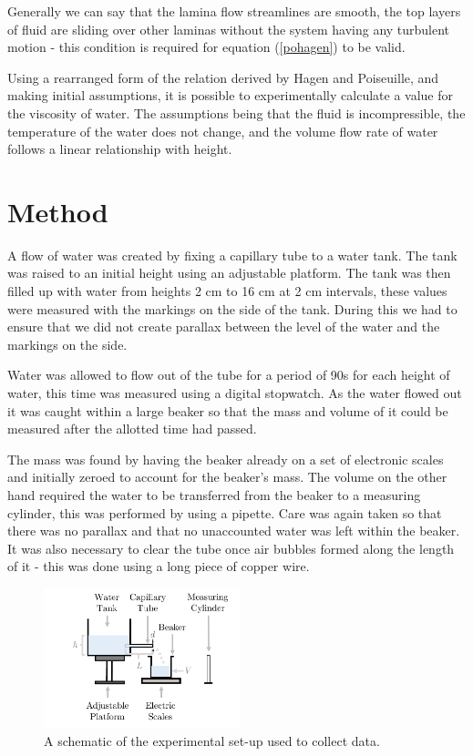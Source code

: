 \documentclass[twocolumn]{revtex4}
\begin{document}
Generally we can say that the lamina flow streamlines are smooth, the top layers of fluid are sliding over other laminas without the system having any turbulent motion - this condition is required for equation (\ref{pohagen}) to be valid. 

Using a rearranged form of the relation derived by Hagen and Poiseuille, and making initial assumptions, it is possible to experimentally calculate a value for the viscosity of water. The assumptions being that the fluid is incompressible, the temperature of the water does not change, and the volume flow rate of water follows a linear relationship with height.

\vspace{-3ex}
\section{Method} 
\vspace{-2ex}
A flow of water was created by fixing a capillary tube to a water tank. The tank was raised to an initial height using an adjustable platform. The tank was then filled up with water from heights 2 cm to 16 cm at 2 cm intervals, these values were measured with the markings on the side of the tank. During this we had to ensure that we did not create parallax between the level of the water and the markings on the side. 

Water was allowed to flow out of the tube for a period of 90s for each height of water, this time was measured using a digital stopwatch. As the water flowed out it was caught within a large beaker so that the mass and volume of it could be measured after the allotted time had passed. 

The mass was found by having the beaker already on a set of electronic scales and initially zeroed to account for the beaker's mass. The volume on the other hand required the water to be transferred from the beaker to a measuring cylinder, this was performed by using a pipette. Care was again taken so that there was no parallax and that no unaccounted water was left within the beaker. It was also necessary to clear the tube once air bubbles formed along the length of it - this was done using a long piece of copper wire. 

\begin{figure}[!h]
\begin{center}
\includegraphics[width=5.7cm]{fig1}
\caption[]{A schematic of the experimental set-up used to collect data. }
\label{fig:fig1}
\end{center}
\end{figure}
\end{document}
